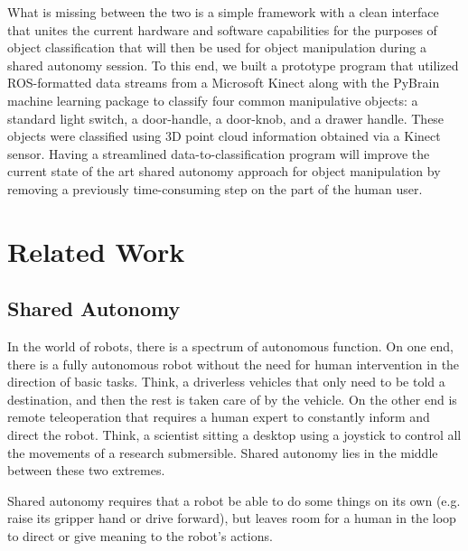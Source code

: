 \documentclass{article}
\begin{document}
What is missing between the two is a simple framework with a clean interface that unites the current hardware and software capabilities for the purposes of object classification that will then be used for object manipulation during a shared autonomy session. To this end, we built a prototype program that utilized ROS-formatted data streams from a Microsoft Kinect along with the PyBrain machine learning package to classify four common manipulative objects: a standard light switch, a door-handle, a door-knob, and a drawer handle. These objects were classified using 3D point cloud information obtained via a Kinect sensor. Having a streamlined data-to-classification program will improve the current state of the art shared autonomy approach for object manipulation by removing a previously time-consuming step on the part of the human user.

\section{Related Work}
\subsection{Shared Autonomy}
In the world of robots, there is a spectrum of autonomous function.  On one end, there is a fully autonomous robot
without the need for human intervention in the direction of basic tasks.  Think, a driverless vehicles that only need to be told a destination, and then the rest is taken care of by the vehicle.  On the other end is remote teleoperation that requires a human expert to constantly inform and direct the robot.  Think, a scientist sitting a desktop using a joystick to control all the movements of a research submersible. Shared autonomy lies in the middle between these two extremes. 

Shared autonomy requires that a robot be able to do some things on its own (e.g. raise its gripper hand or drive forward), but leaves
room for a human in the loop to direct or give meaning to the robot's actions.
\end{document}
